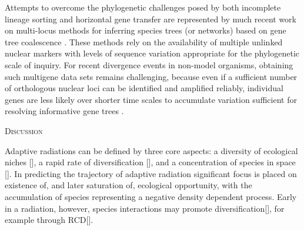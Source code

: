 \documentclass[12pt,letterpaper]{article}
\renewcommand{\section}[1]{%
\bigskip
\begin{center}
\begin{Large}
\normalfont\scshape #1
\medskip
\end{Large}
\end{center}}
\begin{document}
Attempts to overcome the phylogenetic challenges posed by both
incomplete lineage sorting and horizontal gene transfer are
represented by much recent work on multi-locus methods for inferring
species trees (or networks) based on gene tree coalescence
\citep[e.g.,][]{ane_bayesian_2007, liu_best:_2008, kubatko_stem:_2009,
kubatko_identifying_2009, yu_coalescent_2011}. These methods rely on
the availability of multiple unlinked nuclear markers with levels of
sequence variation appropriate for the phylogenetic scale of
inquiry. For recent divergence events in non-model organisms,
obtaining such multigene data sets remains challenging, because even
if a sufficient number of orthologous nuclear loci can be identified
and amplified reliably, individual genes are less likely over shorter
time scales to accumulate variation sufficient for resolving
informative gene trees \citep[e.g.,][]{omeara2010}.


% 
\section{Discussion}
Adaptive radiations can be defined by three core aspects: 
a diversity of ecological niches [], a rapid rate of diversification [], 
and a concentration of species in space []. In predicting the trajectory
of adaptive radiation significant focus is placed on existence of, and 
later saturation of, ecological opportunity, with the accumulation 
of species representing a negative density dependent process. Early in a 
radiation, however, species interactions may promote diversification[], for 
example through RCD[].  
 









\end{document}
